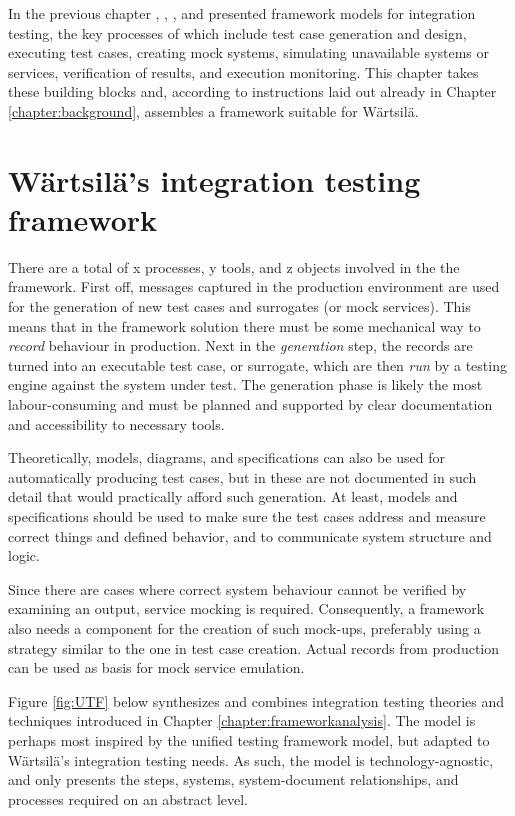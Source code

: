 \documentclass[12pt,a4paper,oneside,pdftex]{report}
\begin{document}
In the previous chapter \citet{fewster1999software}, \citet{huang2008surrogate}, \citet{liu2009unified}, and \citet{laukkanen2006data} presented framework models for integration testing, the key processes of which include test case generation and design, executing test cases, creating mock systems, simulating unavailable systems or services, verification of results, and execution monitoring. This chapter takes these building blocks and, according to instructions laid out already in Chapter \ref{chapter:background}, assembles a framework suitable for Wärtsilä.

\section{Wärtsilä's integration testing framework}

There are a total of x processes, y tools, and z objects involved in the the framework. First off, messages captured in the production environment are used for the generation of new test cases and surrogates (or mock services). This means that in the framework solution there must be some mechanical way to \emph{record} behaviour in production. Next in the \emph{generation} step, the records are turned into an executable test case, or surrogate, which are then \emph{run} by a testing engine against the system under test. The generation phase is likely the most labour-consuming and must be planned and supported by clear documentation and accessibility to necessary tools.

Theoretically, models, diagrams, and specifications can also be used for automatically producing test cases, but in  these are not documented in such detail that would practically afford such generation. At least, models and specifications should be used to make sure the test cases address and measure correct things and defined behavior, and to communicate system structure and logic. 

Since there are cases where correct system behaviour cannot be verified by examining an output, service mocking is required. Consequently, a framework also needs a component for the creation of such mock-ups, preferably using a strategy similar to the one in test case creation. Actual records from production can be used as basis for mock service emulation.

Figure \ref{fig:UTF} below synthesizes and combines integration testing theories and techniques introduced in Chapter \ref{chapter:frameworkanalysis}. The model is perhaps most inspired by the \citet{liu2009unified} unified testing framework model, but adapted to Wärtsilä's integration testing needs. As such, the model is technology-agnostic, and only presents the steps, systems, system-document relationships, and processes required on an abstract level.
\end{document}
